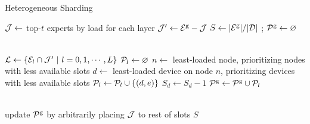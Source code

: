 \begin{algorithm}[hbp]
    \caption{Heterogeneous Sharding}
    \label{algo:o3}
    \SetAlgoLined


    $\mathcal{J} \gets$ top-$t$ experts by load for each layer \; \label{algo:o3:partition-start}
    $\mathcal{J}' \gets \mathcal{E}^\text{g} - \mathcal{J}$ \; \label{algo:o3:partition-end}
    $S \gets |\mathcal{E}^\text{g}| / |\mathcal{D}|$ ;  \label{algo:o3:slots}
    $\mathcal{P}^\text{g} \gets \varnothing$ \;

     \\
    $\set{L} \gets \{\set{E}_{l} \cap \set{J}' \ |\ l = 0, 1, \cdots, L\}$ \; \label{algo:o3:underloaded-start}
     {
        $\mathcal{P}_l \gets \varnothing$ \;
         {
            $n \gets$ least-loaded node, prioritizing nodes with less available slots \;
            $d \gets$ least-loaded device on node $n$, prioritizing devices with less available slots \;
            $\mathcal{P}_l \gets \mathcal{P}_l \cup \{(d, e)\}$\;
            $S_{d} \gets S_{d} - 1$ \;
        }
        $\mathcal{P}^\text{g} \gets \mathcal{P}^\text{g} \cup \mathcal{P}_l$ \;
    } \label{algo:o3:underloaded-end}

     \\
    update $\mathcal{P}^\text{g}$ by arbitrarily placing $\mathcal{J}$ to rest of slots $S$ \; \label{algo:o3:overlappable}

\end{algorithm}
